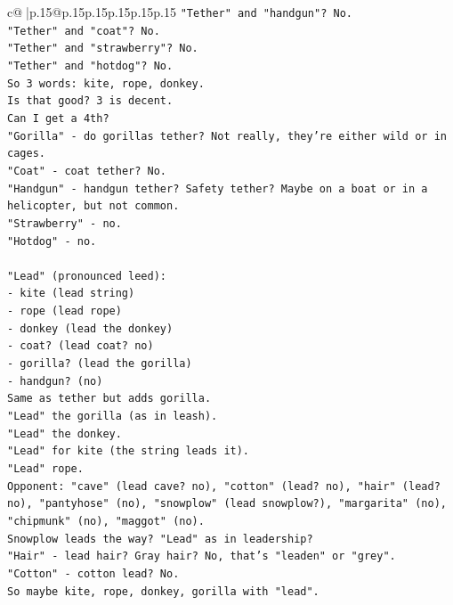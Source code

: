 \documentclass{article}
\begin{document}
{\begin{supertabular}{c@{$\;$}|p{.15\linewidth}@{}p{.15\linewidth}p{.15\linewidth}p{.15\linewidth}p{.15\linewidth}p{.15\linewidth}}
{{{\texttt{"Tether" and "handgun"? No.} \\
\texttt{"Tether" and "coat"? No.} \\
\texttt{"Tether" and "strawberry"? No.} \\
\texttt{"Tether" and "hotdog"? No.} \\
\texttt{So 3 words: kite, rope, donkey.} \\
\texttt{Is that good? 3 is decent.} \\
\texttt{Can I get a 4th?} \\
\texttt{"Gorilla" {-} do gorillas tether? Not really, they're either wild or in cages.} \\
\texttt{"Coat" {-} coat tether? No.} \\
\texttt{"Handgun" {-} handgun tether? Safety tether? Maybe on a boat or in a helicopter, but not common.} \\
\texttt{"Strawberry" {-} no.} \\
\texttt{"Hotdog" {-} no.} \\
\\ 
\texttt{"Lead" (pronounced leed):} \\
\texttt{{-} kite (lead string)} \\
\texttt{{-} rope (lead rope)} \\
\texttt{{-} donkey (lead the donkey)} \\
\texttt{{-} coat? (lead coat? no)} \\
\texttt{{-} gorilla? (lead the gorilla)} \\
\texttt{{-} handgun? (no)} \\
\texttt{Same as tether but adds gorilla.} \\
\texttt{"Lead" the gorilla (as in leash).} \\
\texttt{"Lead" the donkey.} \\
\texttt{"Lead" for kite (the string leads it).} \\
\texttt{"Lead" rope.} \\
\texttt{Opponent: "cave" (lead cave? no), "cotton" (lead? no), "hair" (lead? no), "pantyhose" (no), "snowplow" (lead snowplow?), "margarita" (no), "chipmunk" (no), "maggot" (no).} \\
\texttt{Snowplow leads the way? "Lead" as in leadership?} \\
\texttt{"Hair" {-} lead hair? Gray hair? No, that's "leaden" or "grey".} \\
\texttt{"Cotton" {-} cotton lead? No.} \\
\texttt{So maybe kite, rope, donkey, gorilla with "lead".} \\
}}}
\end{supertabular}}
\end{document}
